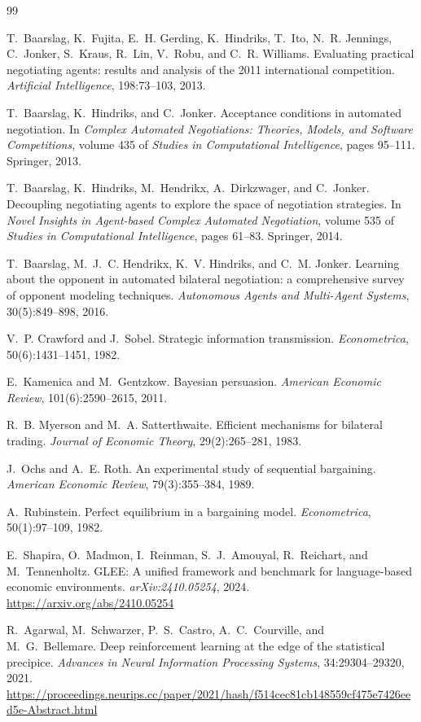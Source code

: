 \clearpage

\begin{thebibliography}{99}\small

T.~Baarslag, K.~Fujita, E.~H. Gerding, K.~Hindriks, T.~Ito, N.~R. Jennings,
C.~Jonker, S.~Kraus, R.~Lin, V.~Robu, and C.~R. Williams.
Evaluating practical negotiating agents: results and analysis of the 2011
international competition.
\emph{Artificial Intelligence}, 198:73--103, 2013.

T.~Baarslag, K.~Hindriks, and C.~Jonker. Acceptance conditions in automated
negotiation. In \emph{Complex Automated Negotiations: Theories, Models, and
Software Competitions}, volume 435 of \emph{Studies in Computational
Intelligence}, pages 95--111. Springer, 2013.

T.~Baarslag, K.~Hindriks, M.~Hendrikx, A.~Dirkzwager, and C.~Jonker.
Decoupling negotiating agents to explore the space of negotiation strategies.
In \emph{Novel Insights in Agent-based Complex Automated Negotiation}, volume
535 of \emph{Studies in Computational Intelligence}, pages 61--83. Springer,
2014.

T.~Baarslag, M.~J.~C. Hendrikx, K.~V. Hindriks, and C.~M. Jonker.
Learning about the opponent in automated bilateral negotiation: a comprehensive
survey of opponent modeling techniques.
\emph{Autonomous Agents and Multi-Agent Systems}, 30(5):849--898, 2016.

V.~P. Crawford and J.~Sobel. Strategic information transmission.
\emph{Econometrica}, 50(6):1431--1451, 1982.

E.~Kamenica and M.~Gentzkow. Bayesian persuasion.
\emph{American Economic Review}, 101(6):2590--2615, 2011.

R.~B. Myerson and M.~A. Satterthwaite. Efficient mechanisms for bilateral trading.
\emph{Journal of Economic Theory}, 29(2):265--281, 1983.

J.~Ochs and A.~E. Roth. An experimental study of sequential bargaining.
\emph{American Economic Review}, 79(3):355--384, 1989.

A.~Rubinstein. Perfect equilibrium in a bargaining model.
\emph{Econometrica}, 50(1):97--109, 1982.

E.~Shapira, O.~Madmon, I.~Reinman, S.~J.~Amouyal, R.~Reichart, and M.~Tennenholtz.
GLEE: A unified framework and benchmark for language-based economic environments.
\emph{arXiv:2410.05254}, 2024. \url{https://arxiv.org/abs/2410.05254}

R.~Agarwal, M.~Schwarzer, P.~S.~Castro, A.~C.~Courville, and M.~G.~Bellemare.
Deep reinforcement learning at the edge of the statistical precipice.
\emph{Advances in Neural Information Processing Systems}, 34:29304--29320, 2021.
\url{https://proceedings.neurips.cc/paper/2021/hash/f514cec81cb148559cf475e7426eed5e-Abstract.html}
\end{thebibliography}


